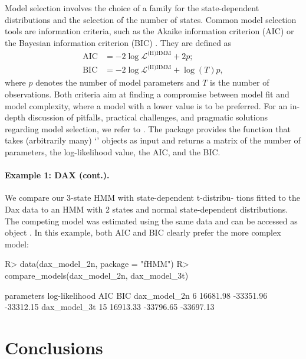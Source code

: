 \documentclass[article]{jss}
\newcommand{\class}[1]{`\code{#1}'}
\newcommand{\fct}[1]{\code{#1()}}
\begin{document}
Model selection involves the choice of a family for the state-dependent distributions and the selection of the number of states. Common model selection tools are information criteria, such as the Akaike information criterion (AIC) \citep{aka74} or the Bayesian information criterion (BIC) \citep{sch78}. They are defined as
\begin{align*}
\text{AIC} &= - 2 \log \mathcal{L}^\text{(H)HMM} + 2 p; \\
\text{BIC} &= - 2 \log \mathcal{L}^\text{(H)HMM} + \log(T) p,
\end{align*}
where $p$ denotes the number of model parameters and $T$ is the number of observations. Both criteria aim at finding a compromise between model fit and model complexity, where a model with a lower value is to be preferred. For an in-depth discussion of pitfalls, practical challenges, and pragmatic solutions regarding model selection, we refer to \cite{poh17}. The  package provides the \fct{compare\_models} function that takes (arbitrarily many) \class{fHMM\_model} objects as input and returns a matrix of the number of parameters, the log-likelihood value, the AIC, and the BIC. 

\paragraph{Example 1: DAX (cont.).} We compare our 3-state HMM with state-dependent t-distribu- tions fitted to the Dax data to an HMM with 2 states and normal state-dependent distributions. The competing model was estimated using the same data and can be accessed as object . In this example, both AIC and BIC clearly prefer the more complex model:

%
\begin{Schunk}
\begin{Sinput}
R> data(dax_model_2n, package = "fHMM")
R> compare_models(dax_model_2n, dax_model_3t)
\end{Sinput}
\begin{Soutput}
             parameters log-likelihood       AIC       BIC
dax_model_2n          6       16681.98 -33351.96 -33312.15
dax_model_3t         15       16913.33 -33796.65 -33697.13
\end{Soutput}
\end{Schunk}
%


\section{Conclusions} \label{sec:conclusion} %
\end{document}
